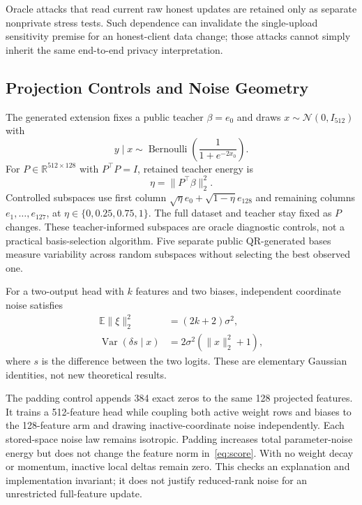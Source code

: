 \documentclass[conference,letterpaper]{IEEEtran}
\newcommand{\R}{\mathbb{R}}
\begin{document}
Oracle attacks that read current raw honest updates are retained only as separate nonprivate stress tests. Such dependence can invalidate the single-upload sensitivity premise for an honest-client data change; those attacks cannot simply inherit the same end-to-end privacy interpretation.

\subsection{Projection Controls and Noise Geometry}
The generated extension fixes a public teacher $\beta=e_0$ and draws $x\sim\mathcal{N}(0,I_{512})$ with
\begin{equation}
y\mid x\sim\operatorname{Bernoulli}\!\left(\frac{1}{1+e^{-2x_0}}\right).
\end{equation}
For $P\in\R^{512\times128}$ with $P^\top P=I$, retained teacher energy is
\begin{equation}
\eta=\lVert P^\top\beta\rVert_2^2.
\end{equation}
Controlled subspaces use first column $\sqrt{\eta}e_0+\sqrt{1-\eta}e_{128}$ and remaining columns $e_1,\ldots,e_{127}$, at $\eta\in\{0,0.25,0.75,1\}$. The full dataset and teacher stay fixed as $P$ changes. These teacher-informed subspaces are oracle diagnostic controls, not a practical basis-selection algorithm. Five separate public QR-generated bases measure variability across random subspaces without selecting the best observed one.

For a two-output head with $k$ features and two biases, independent coordinate noise satisfies
\begin{align}
\mathbb{E}\lVert\xi\rVert_2^2&=(2k+2)\sigma^2,\label{eq:energy}\\
\operatorname{Var}(\delta s\mid x)&=2\sigma^2(\lVert x\rVert_2^2+1),\label{eq:score}
\end{align}
where $s$ is the difference between the two logits. These are elementary Gaussian identities, not new theoretical results.

The padding control appends 384 exact zeros to the same 128 projected features. It trains a 512-feature head while coupling both active weight rows and biases to the 128-feature arm and drawing inactive-coordinate noise independently. Each stored-space noise law remains isotropic. Padding increases total parameter-noise energy but does not change the feature norm in~\eqref{eq:score}. With no weight decay or momentum, inactive local deltas remain zero. This checks an explanation and implementation invariant; it does not justify reduced-rank noise for an unrestricted full-feature update.
\end{document}
